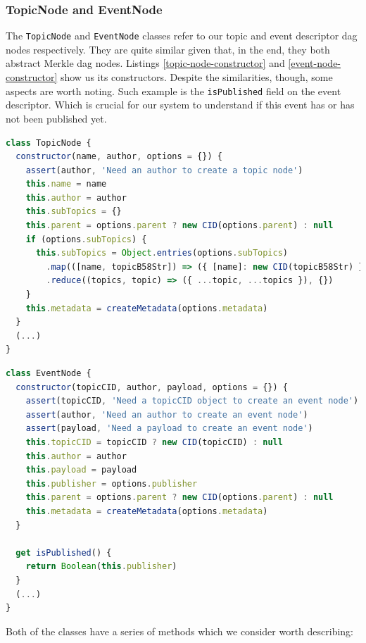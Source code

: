 \subsubsection{TopicNode and EventNode}\label{subsubsec:topic-node}

The \verb|TopicNode| and \verb|EventNode| classes refer to our topic and event
descriptor dag nodes respectively. They are quite similar given that, in the
end, they both abstract Merkle \acrshort{dag} nodes. Listings \ref{topic-node-constructor}
and \ref{event-node-constructor} show us its constructors. Despite the
similarities, though, some aspects are worth noting. Such example is the
\verb|isPublished| field on the event descriptor. Which is crucial for our
system to understand if this event has or has not been published yet.

\begin{lstlisting}[language=JavaScript, float=p, caption={TopicNode class constructor},label={topic-node-constructor}]
class TopicNode {
  constructor(name, author, options = {}) {
    assert(author, 'Need an author to create a topic node')
    this.name = name
    this.author = author
    this.subTopics = {}
    this.parent = options.parent ? new CID(options.parent) : null
    if (options.subTopics) {
      this.subTopics = Object.entries(options.subTopics)
        .map(([name, topicB58Str]) => ({ [name]: new CID(topicB58Str) }))
        .reduce((topics, topic) => ({ ...topic, ...topics }), {})
    }
    this.metadata = createMetadata(options.metadata)
  }
  (...)
}
\end{lstlisting}

\begin{lstlisting}[language=JavaScript, float=p, caption={EventNode class constructor},label={event-node-constructor}]
class EventNode {
  constructor(topicCID, author, payload, options = {}) {
    assert(topicCID, 'Need a topicCID object to create an event node')
    assert(author, 'Need an author to create an event node')
    assert(payload, 'Need a payload to create an event node')
    this.topicCID = topicCID ? new CID(topicCID) : null
    this.author = author
    this.payload = payload
    this.publisher = options.publisher
    this.parent = options.parent ? new CID(options.parent) : null
    this.metadata = createMetadata(options.metadata)
  }

  get isPublished() {
    return Boolean(this.publisher)
  }
  (...)
}
\end{lstlisting}

Both of the classes have a series of methods which we consider worth describing:


